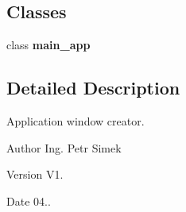 \subsection*{Classes}
\begin{DoxyCompactItemize}
\item 
class \textbf{ main\+\_\+app}
\end{DoxyCompactItemize}


\subsection{Detailed Description}
Application window creator. 

\begin{DoxyAuthor}{Author}
Ing. Petr Simek 
\end{DoxyAuthor}
\begin{DoxyVersion}{Version}
V1. 
\end{DoxyVersion}
\begin{DoxyDate}{Date}
04.. 
\end{DoxyDate}
